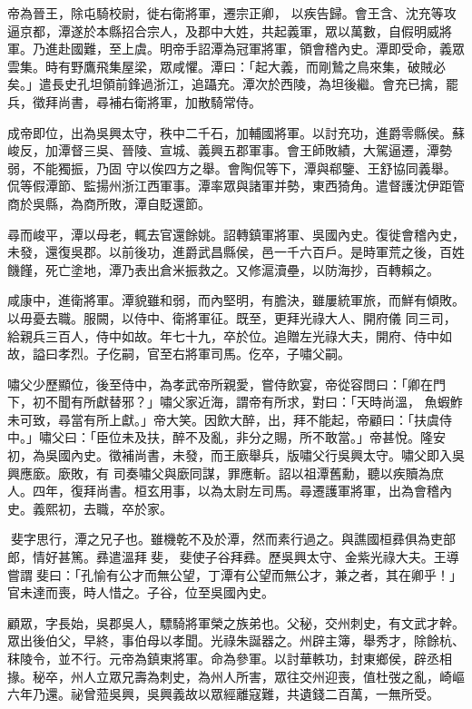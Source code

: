 \begin{pinyinscope}
 帝為晉王，除屯騎校尉，徙右衛將軍，遷宗正卿，
 以疾告歸。會王含、沈充等攻逼京都，潭遂於本縣招合宗人，及郡中大姓，共起義軍，眾以萬數，自假明威將軍。乃進赴國難，至上虞。明帝手詔潭為冠軍將軍，領會稽內史。潭即受命，義眾雲集。時有野鷹飛集屋梁，眾咸懼。潭曰：「起大義，而剛鷙之鳥來集，破賊必矣。」遣長史孔坦領前鋒過浙江，追躡充。潭次於西陵，為坦後繼。會充已擒，罷兵，徵拜尚書，尋補右衛將軍，加散騎常侍。



 成帝即位，出為吳興太守，秩中二千石，加輔國將軍。以討充功，進爵零縣侯。蘇峻反，加潭督三吳、晉陵、宣城、義興五郡軍事。會王師敗績，大駕逼遷，潭勢弱，不能獨振，乃固
 守以俟四方之舉。會陶侃等下，潭與郗鑒、王舒協同義舉。侃等假潭節、監揚州浙江西軍事。潭率眾與諸軍并勢，東西猗角。遣督護沈伊距管商於吳縣，為商所敗，潭自貶還節。



 尋而峻平，潭以母老，輒去官還餘姚。詔轉鎮軍將軍、吳國內史。復徙會稽內史，未發，還復吳郡。以前後功，進爵武昌縣侯，邑一千六百戶。是時軍荒之後，百姓饑饉，死亡塗地，潭乃表出倉米振救之。又修滬瀆壘，以防海抄，百轉賴之。



 咸康中，進衛將軍。潭貌雖和弱，而內堅明，有膽決，雖屢統軍旅，而鮮有傾敗。以毋憂去職。服闕，以侍中、衛將軍征。既至，更拜光祿大人、開府儀
 同三司，給親兵三百人，侍中如故。年七十九，卒於位。追贈左光祿大夫，開府、侍中如故，謚曰孝烈。子仡嗣，官至右將軍司馬。仡卒，子嘯父嗣。


嘯父少歷顯位，後至侍中，為孝武帝所親愛，嘗侍飲宴，帝從容問曰：「卿在門下，初不聞有所獻替邪？」嘯父家近海，謂帝有所求，對曰：「天時尚溫，
 魚蝦鮓未可致，尋當有所上獻。」帝大笑。因飲大醉，出，拜不能起，帝顧曰：「扶虞侍中。」嘯父曰：「臣位未及扶，醉不及亂，非分之賜，所不敢當。」帝甚悅。隆安初，為吳國內史。徵補尚書，未發，而王廞舉兵，版嘯父行吳興太守。嘯父即入吳興應廞。廞敗，有
 司奏嘯父與廞同謀，罪應斬。詔以祖潭舊勳，聽以疾贖為庶人。四年，復拜尚書。桓玄用事，以為太尉左司馬。尋遷護軍將軍，出為會稽內史。義熙初，去職，卒於家。



 斐字思行，潭之兄子也。雖機乾不及於潭，然而素行過之。與譙國桓彞俱為吏部郎，情好甚篤。彞遣溫拜斐，斐使子谷拜彞。歷吳興太守、金紫光祿大夫。王導嘗謂斐曰：「孔愉有公才而無公望，丁潭有公望而無公才，兼之者，其在卿乎！」官未達而喪，時人惜之。子谷，位至吳國內史。



 顧眾，字長始，吳郡吳人，驃騎將軍榮之族弟也。父秘，交州刺史，有文武才幹。眾出後伯父，早終，事伯母以孝聞。光祿朱誕器之。州辟主簿，舉秀才，除餘杭、秣陵令，並不行。元帝為鎮東將軍。命為參軍。以討華軼功，封東鄉侯，辟丞相掾。秘卒，州人立眾兄壽為刺史，為州人所害，眾往交州迎喪，值杜弢之亂，崎嶇六年乃還。祕曾蒞吳興，吳興義故以眾經離寇難，共遺錢二百萬，一無所受。




\end{pinyinscope}
